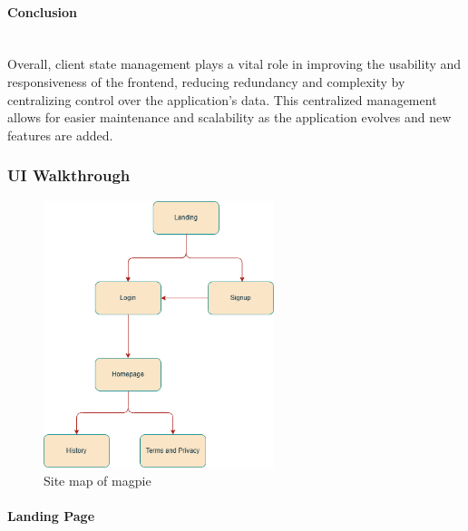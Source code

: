     \paragraph{Conclusion}\mbox{}\\
    \newline
    Overall, client state management plays a vital role in improving the usability and responsiveness of the frontend, reducing redundancy and complexity by centralizing control over the application’s data. This centralized management allows for easier maintenance and scalability as the application evolves and new features are added.

\subsubsection{UI Walkthrough}
\begin{figure}[h]
    \centering
    \includegraphics[width=0.6\textwidth]{images/site/sitemap.png}
    \caption{Site map of magpie}
\end{figure}
\paragraph{Landing Page}\mbox{}\\


